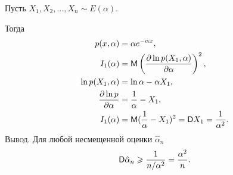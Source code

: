 \begin{ex}
	Пусть  $X_1, X_2, \dots, X_n \sim E(\alpha)$.

	Тогда
	\begin{align*}
		p(x, \alpha) &= \alpha e^{-\alpha x},\\
		I_1(\alpha) &= \mathsf M \left(\frac{\partial\ln p(X_1, \alpha)}{\partial\alpha}\right)^2,\\
		\ln p(X_1, \alpha) &= \ln \alpha - \alpha X_1,\\
		\frac{\partial \ln p}{\partial\alpha} &= \frac{1}{\alpha} - X_1,\\
		I_1(\alpha) &= \mathsf M (\frac{1}{\alpha} - X_1)^2 = \mathsf D X_1 = \dfrac{1}{\alpha^2}.
\end{align*}
\textsc{Вывод}. Для любой несмещенной оценки $\hat\alpha_n$
\[
	\mathsf D \hat\alpha_n \geqslant \frac{1}{n/\alpha^2} = \frac{\alpha^2}{n}.
\]
\end{ex}


